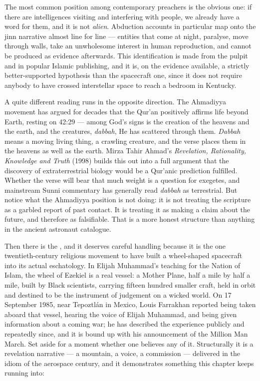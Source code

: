 The most common position among contemporary preachers is the obvious one: if there are
intelligences visiting and interfering with people, we already have a word for them, and it is
not \emph{alien}. Abduction accounts in particular map onto the jinn narrative almost line for
line --- entities that come at night, paralyse, move through walls, take an unwholesome interest
in human reproduction, and cannot be produced as evidence afterwards. This identification is made
from the pulpit and in popular Islamic publishing, and it is, on the evidence available, a
strictly better-supported hypothesis than the spacecraft one, since it does not require anybody to
have crossed interstellar space to reach a bedroom in Kentucky.

A quite different reading runs in the opposite direction. The Ahmadiyya movement has argued for
decades that the Qur'an positively affirms life beyond Earth, resting on 42:29 --- among God's
signs is the creation of the heavens and the earth, and the creatures, \emph{dabbah}, He has
scattered through them. \emph{Dabbah} means a moving living thing, a crawling creature, and the
verse places them in the heavens as well as the earth. Mirza Tahir Ahmad's \emph{Revelation,
Rationality, Knowledge and Truth} (1998) builds this out into a full argument that the discovery
of extraterrestrial biology would be a Qur'anic prediction fulfilled. Whether the verse will bear
that much weight is a question for exegetes, and mainstream Sunni commentary has generally read
\emph{dabbah} as terrestrial. But notice what the Ahmadiyya position is not doing: it is not
treating the scripture as a garbled report of past contact. It is treating it as making a claim
about the future, and therefore as falsifiable. That is a more honest structure than anything in
the ancient astronaut catalogue.

Then there is the , and it deserves careful handling because it is the one
twentieth-century religious movement to have built a wheel-shaped spacecraft into its actual
eschatology. In Elijah Muhammad's teaching for the Nation of Islam, the wheel of Ezekiel is a
real vessel: a Mother Plane, half a mile by half a mile, built by Black scientists, carrying
fifteen hundred smaller craft, held in orbit and destined to be the instrument of judgement on a
wicked world. On 17 September 1985, near Tepoztl\'an in Mexico, Louis Farrakhan reported being
taken aboard that vessel, hearing the voice of Elijah Muhammad, and being given information about
a coming war; he has described the experience publicly and repeatedly since, and it is bound up
with his announcement of the Million Man March. Set aside for a moment whether one believes any of
it. Structurally it is a revelation narrative --- a mountain, a voice, a commission --- delivered in
the idiom of the aerospace century, and it demonstrates something this chapter keeps running into:

